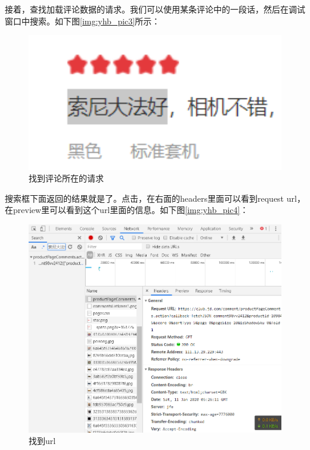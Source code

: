 接着，查找加载评论数据的请求。我们可以使用某条评论中的一段话，然后在调试窗口中搜索。如下图\ref{img:yhb_pic3}所示：
\begin{figure}[htbp]
\centering
\includegraphics[width=13.5cm]{img/yhb/find_request_jd.png}
\caption{找到评论所在的请求} %
\label{img:yhb_pict3}   %
\end{figure}

搜索框下面返回的结果就是了。点击，在右面的headers里面可以看到request url，在preview里可以看到这个url里面的信息。如下图\ref{img:yhb_pic4}：
\begin{figure}[htbp]
\centering
\includegraphics[width=13.5cm]{img/yhb/find_url_jd.png}
\caption{找到url} %
\label{img:yhb_pict4}   %
\end{figure}

